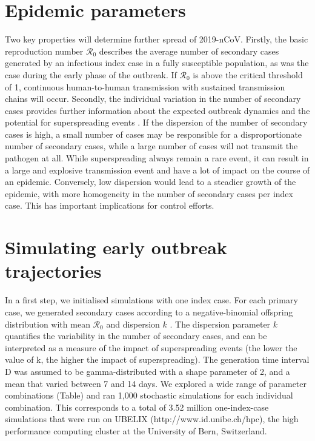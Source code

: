 \documentclass{article}
\begin{document}
\section*{Epidemic parameters}

Two key properties will determine further spread of 2019-nCoV. Firstly, the basic reproduction number $\mathcal{R}_0$ describes the average number of secondary cases generated by an infectious index case in a fully susceptible population, as was the case during the early phase of the outbreak. If $\mathcal{R}_0$ is above the critical threshold of 1, continuous human-to-human transmission with sustained transmission chains will occur. Secondly, the individual variation in the number of secondary cases provides further information about the expected outbreak dynamics and the potential for superspreading events \cite{Lloyd-Smith:2005,Althaus:2015b,Kucharski:2015b}. If the dispersion of the number of secondary cases is high, a small number of cases may be responsible for a disproportionate number of secondary cases, while a large number of cases will not transmit the pathogen at all. While superspreading always remain a rare event, it can result in a large and explosive transmission event and have a lot of impact on the course of an epidemic. Conversely, low dispersion would lead to a steadier growth of the epidemic, with more homogeneity in the number of secondary cases per index case. This has important implications for control efforts.

\section*{Simulating early outbreak trajectories}

In a first step, we initialised simulations with one index case. For each primary case, we generated secondary cases according to a negative-binomial offspring distribution with mean $\mathcal{R}_0$ and dispersion $k$ \cite{Lloyd-Smith:2005,Althaus:2015b}. The dispersion parameter $k$ quantifies the variability in the number of secondary cases, and can be interpreted as a measure of the impact of superspreading events (the lower the value of k, the higher the impact of superspreading). The generation time interval D was assumed to be gamma-distributed with a shape parameter of 2, and a mean that varied between 7 and 14 days. We explored a wide range of parameter combinations (Table) and ran 1,000 stochastic simulations for each individual combination. This corresponds to a total of 3.52 million one-index-case simulations that were run on UBELIX (http://www.id.unibe.ch/hpc), the high performance computing cluster at the University of Bern, Switzerland.
\end{document}
